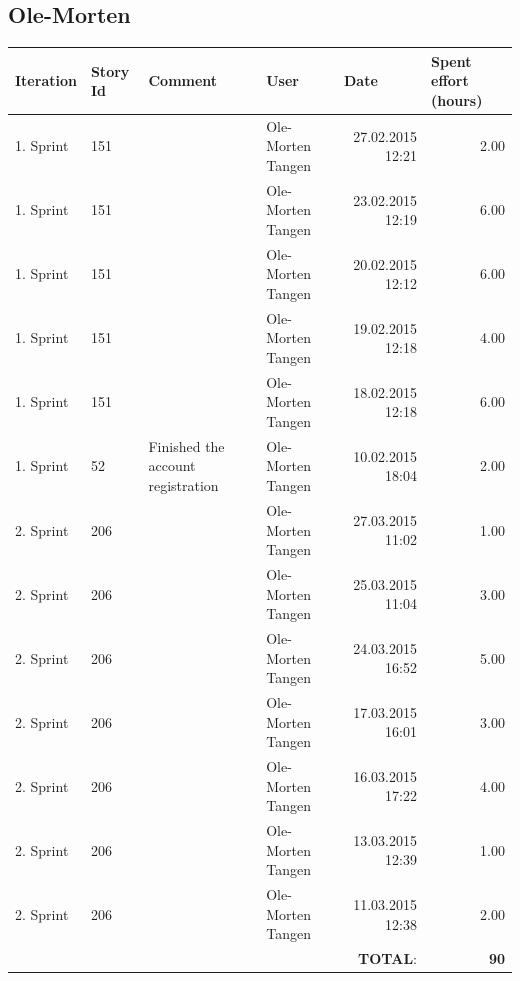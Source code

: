 \documentclass[a4paper]{article}
\begin{document}
\begin{landscape}
\subsection{Ole-Morten}
\begin{tabular}{|l|l|l|l|r|r|}
\hline
\textbf{Iteration} & \textbf{Story Id} & \textbf{Comment} & \textbf{User} & \multicolumn{1}{l|}{\textbf{Date}} & \multicolumn{1}{l|}{\textbf{Spent effort (hours)}} \\ \hline
1. Sprint & 151 &  & Ole-Morten Tangen & 27.02.2015 12:21 & 2.00 \\ \hline
1. Sprint & 151 &  & Ole-Morten Tangen & 23.02.2015 12:19 & 6.00 \\ \hline
1. Sprint & 151 &  & Ole-Morten Tangen & 20.02.2015 12:12 & 6.00 \\ \hline
1. Sprint & 151 &  & Ole-Morten Tangen & 19.02.2015 12:18 & 4.00 \\ \hline
1. Sprint & 151 &  & Ole-Morten Tangen & 18.02.2015 12:18 & 6.00 \\ \hline
1. Sprint & 52 & Finished the account registration & Ole-Morten Tangen & 10.02.2015 18:04 & 2.00 \\ \hline
2. Sprint & 206 &  & Ole-Morten Tangen & 27.03.2015 11:02 & 1.00 \\ \hline
2. Sprint & 206 &  & Ole-Morten Tangen & 25.03.2015 11:04 & 3.00 \\ \hline
2. Sprint & 206 &  & Ole-Morten Tangen & 24.03.2015 16:52 & 5.00 \\ \hline
2. Sprint & 206 &  & Ole-Morten Tangen & 17.03.2015 16:01 & 3.00 \\ \hline
2. Sprint & 206 &  & Ole-Morten Tangen & 16.03.2015 17:22 & 4.00 \\ \hline
2. Sprint & 206 &  & Ole-Morten Tangen & 13.03.2015 12:39 & 1.00 \\ \hline
2. Sprint & 206 &  & Ole-Morten Tangen & 11.03.2015 12:38 & 2.00 \\ \hline
 & & & &\textbf{TOTAL}: & \textbf{90} \\ \hline
\end{tabular}



\end{landscape}
\end{document}
